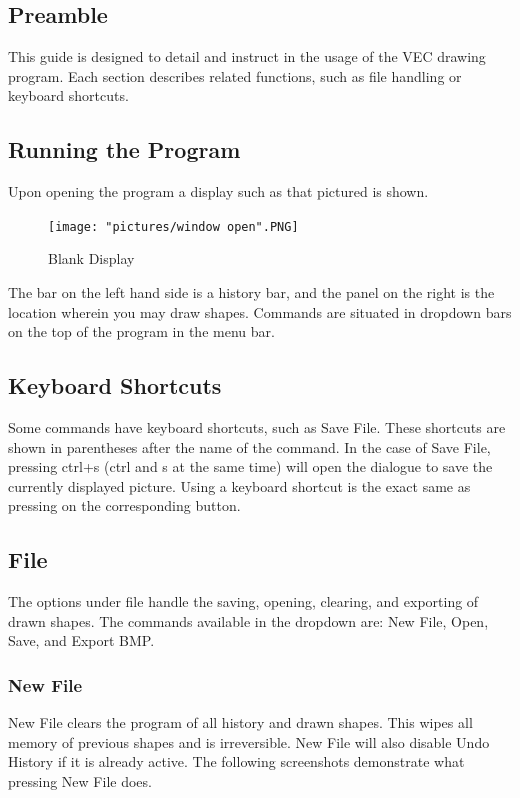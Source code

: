 \documentclass[12pt]{article} %
\begin{document}
\subsection{Preamble}
This guide is designed to detail and instruct in the usage of the VEC drawing program. Each section describes related functions, such as file handling or keyboard shortcuts.

\subsection{Running the Program}
Upon opening the program a display such as that pictured is shown. 

\begin{figure}[hbtp]
\caption{Blank Display}
\centering
\texttt{[image: "pictures/window open".PNG]}
\end{figure}


The bar on the left hand side is a history bar, and the panel on the right is the location wherein you may draw shapes. Commands are situated in dropdown bars on the top of the program in the menu bar. 

\subsection{Keyboard Shortcuts}
Some commands have keyboard shortcuts, such as Save File. These shortcuts are shown in parentheses after the name of the command. In the case of Save File, pressing ctrl+s (ctrl and s at the same time) will open the dialogue to save the currently displayed picture. Using a keyboard shortcut is the exact same as pressing on the corresponding button.

\subsection{File}
The options under file handle the saving, opening, clearing, and exporting of drawn shapes. The commands available in the dropdown are: New File, Open, Save, and Export BMP.

\subsubsection{New File}
New File clears the program of all history and drawn shapes. This wipes all memory of previous shapes and is irreversible. New File will also disable Undo History if it is already active. The following screenshots demonstrate what pressing New File does.
\end{document}
